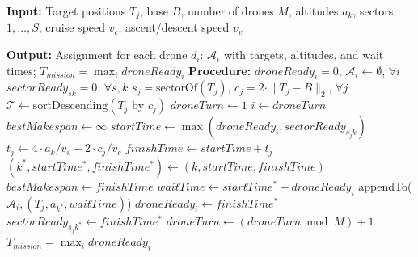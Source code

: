 \documentclass[subscriptcorrection,upint,nolists, varvw,barcolor=Goldenrod3,mathalfa=cal=euler,balance,hyphenate,french]{asmejour} %
\begin{document}
\begin{algorithm}[H]
\caption{Round-Robin Scheduling (RRS) Algorithm}
\begin{algorithmic}[1]
\STATE \textbf{Input:} Target positions $T_j$, base $B$, number of drones $M$, altitudes $a_k$, sectors $1,\ldots,S$, cruise speed $v_c$, ascent/descent speed $v_v$

\STATE \textbf{Output:} Assignment for each drone $d_i$: $\mathcal{A}_i$ with targets, altitudes, and wait times; $T_{\mathit{mission}} = \max_i \mathit{droneReady}_i$
\STATE \textbf{Procedure:}
\STATE $\mathit{droneReady}_i = 0$, $\mathcal{A}_i \leftarrow \emptyset$, $\forall i$
\STATE $\mathit{sectorReady}_{sk} = 0$, $\forall s,k$
\STATE $s_j = \text{sectorOf}(T_j)$, $c_j = 2\cdot\|T_j - B\|_2$, $\forall j$
\STATE $\mathcal{T} \gets \text{sortDescending}(T_j \text{ by } c_j)$
\STATE $droneTurn \gets 1$
    \STATE $i \gets droneTurn$
    \STATE $bestMakespan \gets \infty$
        \STATE $startTime \gets \max(\mathit{droneReady}_i, \mathit{sectorReady}_{s_jk})$
        \STATE $t_j \gets 4\cdot a_k/v_v + 2\cdot c_j/v_c$
        \STATE $finishTime \gets startTime + t_j$
            \STATE $(k^\ast, startTime^\ast, finishTime^\ast) \gets (k, startTime, finishTime)$
            \STATE $bestMakespan \gets finishTime$
        \ENDIF
    \ENDFOR
    \STATE $waitTime \gets startTime^\ast - \mathit{droneReady}_i$
    \STATE appendTo($\mathcal{A}_i, (T_j, a_{k^\ast}, waitTime)$)
    \STATE $\mathit{droneReady}_i \gets finishTime^\ast$
    \STATE $\mathit{sectorReady}_{s_jk^\ast} \gets finishTime^\ast$
    \STATE $droneTurn \gets (droneTurn \bmod M) + 1$
\ENDFOR
\STATE $T_{\mathit{mission}} = \max_i \mathit{droneReady}_i$

\end{algorithmic}
\label{alg:RRS}
\end{algorithm}




\end{document}

